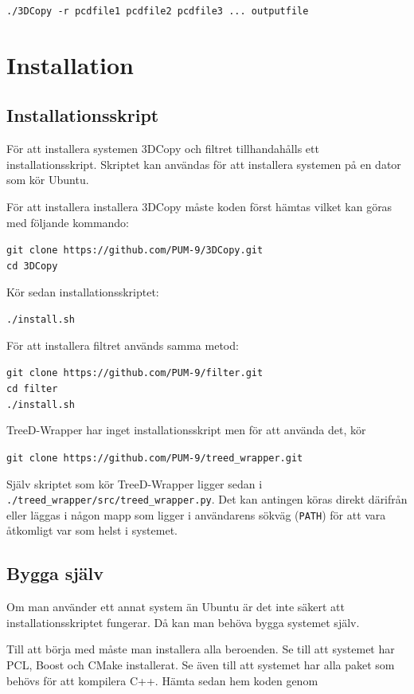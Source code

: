 \documentclass[a4paper,titlepage,12pt]{article}
\begin{document}
		\texttt{./3DCopy -r pcdfile1 pcdfile2 pcdfile3 ... outputfile}
\newpage
   
    
\section{Installation}
\subsection{Installationsskript}
	För att installera systemen 3DCopy och filtret tillhandahålls ett installationsskript. Skriptet kan användas för att installera systemen på en dator som kör Ubuntu.
	
	För att installera installera 3DCopy måste koden först hämtas vilket kan göras med följande kommando:
	
	\texttt{git clone https://github.com/PUM-9/3DCopy.git \\
	cd 3DCopy}
	
	Kör sedan installationsskriptet:
	
	\texttt{./install.sh}
	
	För att installera filtret används samma metod:
	
	\texttt{git clone https://github.com/PUM-9/filter.git \\
	cd filter \\
	./install.sh}
	
	TreeD-Wrapper har inget installationsskript men för att använda det, kör
	
	\texttt{git clone https://github.com/PUM-9/treed\_wrapper.git}
	
	Själv skriptet som kör TreeD-Wrapper ligger sedan i \texttt{./treed\_wrapper/src/treed\_wrapper.py}. Det kan antingen köras direkt därifrån eller läggas i någon mapp som ligger i användarens sökväg (\texttt{PATH}) för att vara åtkomligt var som helst i systemet.
	
\subsection{Bygga själv}
	Om man använder ett annat system än Ubuntu är det inte säkert att installationsskriptet fungerar. Då kan man behöva bygga systemet själv.
	
	Till att börja med måste man installera alla beroenden. Se till att systemet har PCL, Boost och CMake installerat. Se även till att systemet har alla paket som behövs för att kompilera C++. Hämta sedan hem koden genom
	
\end{document}

